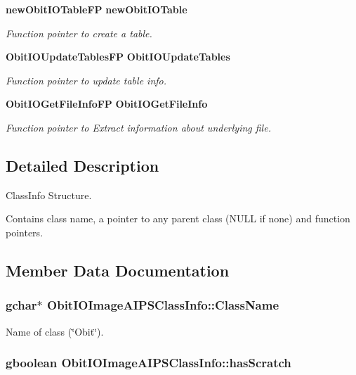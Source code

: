 \begin{CompactItemize}
{\bf new\-Obit\-IOTable\-FP} {\bf new\-Obit\-IOTable}
\begin{CompactList}\small\item\em Function pointer to create a table. \item\end{CompactList}\item 
{\bf Obit\-IOUpdate\-Tables\-FP} {\bf Obit\-IOUpdate\-Tables}
\begin{CompactList}\small\item\em Function pointer to update table info. \item\end{CompactList}\item 
{\bf Obit\-IOGet\-File\-Info\-FP} {\bf Obit\-IOGet\-File\-Info}
\begin{CompactList}\small\item\em Function pointer to Extract information about underlying file. \item\end{CompactList}\end{CompactItemize}


\subsection{Detailed Description}
Class\-Info Structure. 

Contains class name, a pointer to any parent class (NULL if none) and function pointers. 



\subsection{Member Data Documentation}
\subsubsection{\setlength{\rightskip}{0pt plus 5cm}gchar$\ast$ {\bf Obit\-IOImage\-AIPSClass\-Info::Class\-Name}}\label{structObitIOImageAIPSClassInfo_o2}


Name of class (\char`\"{}Obit\char`\"{}). 

\subsubsection{\setlength{\rightskip}{0pt plus 5cm}gboolean {\bf Obit\-IOImage\-AIPSClass\-Info::has\-Scratch}}\label{structObitIOImageAIPSClassInfo_o1}


